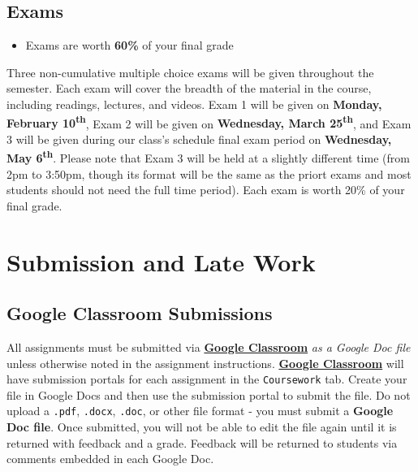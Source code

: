 \documentclass[]{book}
\newenvironment{rmdblock}[1]
  {\begin{shaded*}
  \begin{itemize}
  \renewcommand{\labelitemi}{
    \raisebox{-.7\height}[0pt][0pt]{
      {\setkeys{Gin}{width=3em,keepaspectratio}\texttt{[image: images/\#1]}}
    }
  }
  \item
  }
  {
  \end{itemize}
  \end{shaded*}
  }
\newenvironment{rmdtip}
  {\begin{rmdblock}{tip}}
  {\end{rmdblock}}
\begin{document}
\hypertarget{exams}{%
\subsection{Exams}\label{exams}}

\begin{rmdtip}
Exams are worth \textbf{60\%} of your final grade
\end{rmdtip}

Three non-cumulative multiple choice exams will be given throughout the semester. Each exam will cover the breadth of the material in the course, including readings, lectures, and videos. Exam 1 will be given on \textbf{Monday, February 10\textsuperscript{th}}, Exam 2 will be given on \textbf{Wednesday, March 25\textsuperscript{th}}, and Exam 3 will be given during our class's schedule final exam period on \textbf{Wednesday, May 6\textsuperscript{th}}. Please note that Exam 3 will be held at a slightly different time (from 2pm to 3:50pm, though its format will be the same as the priort exams and most students should not need the full time period). Each exam is worth 20\% of your final grade.

\hypertarget{submission-and-late-work}{%
\section{Submission and Late Work}\label{submission-and-late-work}}

\hypertarget{google-classroom-submissions}{%
\subsection{Google Classroom Submissions}\label{google-classroom-submissions}}

All assignments must be submitted via \textbf{\href{https://classroom.google.com}{Google Classroom}} \emph{as a Google Doc file} unless otherwise noted in the assignment instructions. \textbf{\href{https://classroom.google.com}{Google Classroom}} will have submission portals for each assignment in the \texttt{Coursework} tab. Create your file in Google Docs and then use the submission portal to submit the file. Do not upload a \texttt{.pdf}, \texttt{.docx}, \texttt{.doc}, or other file format - you must submit a \textbf{Google Doc file}. Once submitted, you will not be able to edit the file again until it is returned with feedback and a grade. Feedback will be returned to students via comments embedded in each Google Doc.
\end{document}
